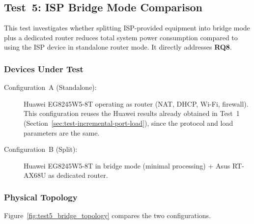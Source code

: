 \subsection{Test~5: \ac{ISP} Bridge Mode Comparison}
\label{sec:test-bridge-mode}

This test investigates whether splitting \ac{ISP}-provided equipment into bridge mode plus a dedicated router reduces total system power consumption compared to using the \ac{ISP} device in standalone router mode.
It directly addresses \textbf{RQ8}.

\subsubsection{Devices Under Test}
\begin{description}
    \item[Configuration~A (Standalone):] Huawei EG8245W5-8T operating as router (NAT, DHCP, Wi-Fi, firewall).
        This configuration reuses the Huawei results already obtained in Test~1 (Section~\ref{sec:test-incremental-port-load}), since the protocol and load parameters are the same.
    \item[Configuration~B (Split):] Huawei EG8245W5-8T in bridge mode (minimal processing) + Asus RT-AX68U as dedicated router.
\end{description}

\subsubsection{Physical Topology}
Figure~\ref{fig:test5_bridge_topology} compares the two configurations.

